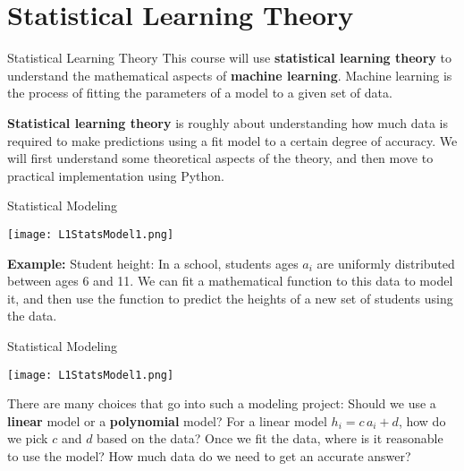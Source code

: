 \documentclass[10pt, handout]{beamer}
\begin{document}
\section{Statistical Learning Theory}


\begin{frame}[fragile]{Statistical Learning Theory}
This course will use \textbf{statistical learning theory} to understand the mathematical aspects of \textbf{machine learning}. Machine learning is the process of fitting the parameters of a model to a given set of data.

\textbf{Statistical learning theory} is roughly about understanding how much data is required to make predictions using a fit model to a certain degree of accuracy. We will first understand some theoretical aspects of the theory, and then move to practical implementation using Python.
\end{frame}


\begin{frame}[t]{Statistical Modeling}
  \begin{minipage}[t][0.5\textheight][t]{\textwidth}
    \centering
     \texttt{[image: L1StatsModel1.png]}
  \end{minipage}
  \vfill
  \begin{minipage}[t][0.5\textheight][t]{\textwidth}
  \textbf{Example:} Student height: In a school, students ages $a_i$ are uniformly distributed between ages 6 and 11. We can fit a mathematical function to this data to model it, and then use the function to predict the heights of a new set of students using the data. 
  \end{minipage}
\end{frame}


\begin{frame}[t]{Statistical Modeling}
  \begin{minipage}[t][0.5\textheight][t]{\textwidth}
    \centering
     \texttt{[image: L1StatsModel1.png]}
  \end{minipage}
  \vfill
  \begin{minipage}[t][0.5\textheight][t]{\textwidth}
There are many choices that go into such a modeling project: Should we use a \textbf{linear} model or a \textbf{polynomial} model? \pause For a linear model $h_i = c \, a_i + d$, how do we pick  $c$ and $d$ based on the data? \pause Once we fit the data, where is it reasonable to use the model? \pause How much data do we need to get an accurate answer?
  \end{minipage}
\end{frame}
\end{document}
